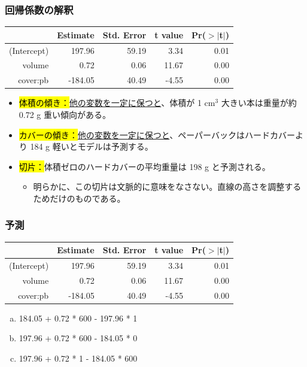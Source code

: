 \begin{frame}
\frametitle{回帰係数の解釈}

{\small
\begin{center}
\begin{tabular}{rrrrr}
  \hline
 & Estimate & Std. Error & t value & Pr($>$$|$t$|$) \\
  \hline
(Intercept) & 197.96 & 59.19 & 3.34 & 0.01 \\
  volume & 0.72 & 0.06 & 11.67 & 0.00 \\
  cover:pb & -184.05 & 40.49 & -4.55 & 0.00 \\
   \hline
\end{tabular}
\end{center}
}

\begin{itemize}

\item \hl{体積の傾き：}\underline{他の変数を一定に保つと}、体積が 1 cm$^3$ 大きい本は重量が約 0.72 g 重い傾向がある。

\item \hl{カバーの傾き：}\underline{他の変数を一定に保つと}、ペーパーバックはハードカバーより 184 g 軽いとモデルは予測する。

\item \hl{切片：}体積ゼロのハードカバーの平均重量は 198 g と予測される。
\begin{itemize}
\item 明らかに、この切片は文脈的に意味をなさない。直線の高さを調整するためだけのものである。
\end{itemize}

\end{itemize}

\end{frame}


\begin{frame}
\frametitle{予測}


{\small
\begin{center}
\begin{tabular}{rrrrr}
  \hline
 & Estimate & Std. Error & t value & Pr($>$$|$t$|$) \\
  \hline
(Intercept) & 197.96 & 59.19 & 3.34 & 0.01 \\
  volume & 0.72 & 0.06 & 11.67 & 0.00 \\
  cover:pb & -184.05 & 40.49 & -4.55 & 0.00 \\
   \hline
\end{tabular}
\end{center}
}

\begin{enumerate}[(a)]
 
\item 184.05 + 0.72 * 600 - 197.96 * 1
\item 197.96 + 0.72 * 600 - 184.05 * 0
\item 197.96 + 0.72 * 1 - 184.05 * 600
\end{enumerate}

\end{frame}

